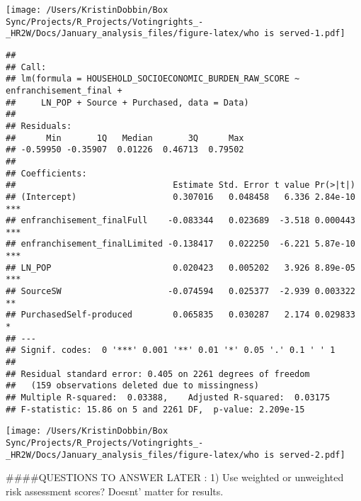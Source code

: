 \documentclass[
]{article}
\begin{document}
\texttt{[image: /Users/KristinDobbin/Box Sync/Projects/R\_Projects/Votingrights\_-\_HR2W/Docs/January\_analysis\_files/figure-latex/who is served-1.pdf]}

\begin{verbatim}
## 
## Call:
## lm(formula = HOUSEHOLD_SOCIOECONOMIC_BURDEN_RAW_SCORE ~ enfranchisement_final + 
##     LN_POP + Source + Purchased, data = Data)
## 
## Residuals:
##      Min       1Q   Median       3Q      Max 
## -0.59950 -0.35907  0.01226  0.46713  0.79502 
## 
## Coefficients:
##                               Estimate Std. Error t value Pr(>|t|)    
## (Intercept)                   0.307016   0.048458   6.336 2.84e-10 ***
## enfranchisement_finalFull    -0.083344   0.023689  -3.518 0.000443 ***
## enfranchisement_finalLimited -0.138417   0.022250  -6.221 5.87e-10 ***
## LN_POP                        0.020423   0.005202   3.926 8.89e-05 ***
## SourceSW                     -0.074594   0.025377  -2.939 0.003322 ** 
## PurchasedSelf-produced        0.065835   0.030287   2.174 0.029833 *  
## ---
## Signif. codes:  0 '***' 0.001 '**' 0.01 '*' 0.05 '.' 0.1 ' ' 1
## 
## Residual standard error: 0.405 on 2261 degrees of freedom
##   (159 observations deleted due to missingness)
## Multiple R-squared:  0.03388,    Adjusted R-squared:  0.03175 
## F-statistic: 15.86 on 5 and 2261 DF,  p-value: 2.209e-15
\end{verbatim}

\texttt{[image: /Users/KristinDobbin/Box Sync/Projects/R\_Projects/Votingrights\_-\_HR2W/Docs/January\_analysis\_files/figure-latex/who is served-2.pdf]}

\#\#\#\#QUESTIONS TO ANSWER LATER : 1) Use weighted or unweighted risk
assessment scores? Doesnt' matter for results.
\end{document}
